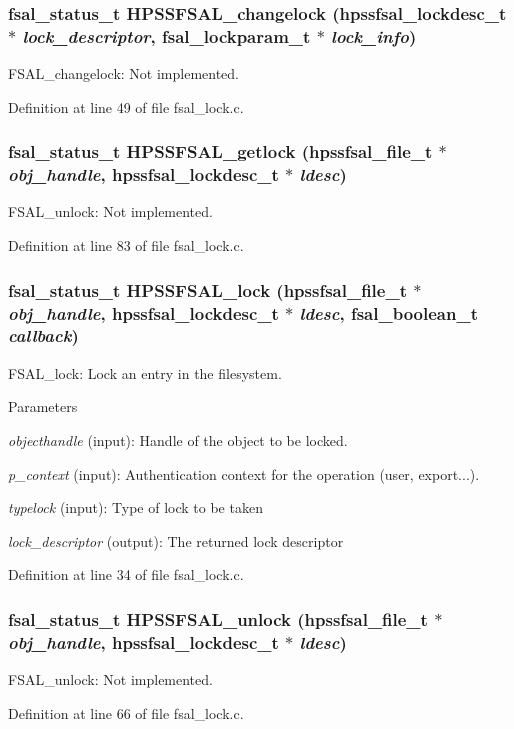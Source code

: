 \subsubsection[{HPSSFSAL\_\-changelock}]{\setlength{\rightskip}{0pt plus 5cm}fsal\_\-status\_\-t HPSSFSAL\_\-changelock (hpssfsal\_\-lockdesc\_\-t $\ast$ {\em lock\_\-descriptor}, \/  fsal\_\-lockparam\_\-t $\ast$ {\em lock\_\-info})}\label{fsal__lock_8c_a1477a0a33dbc4e71308baa30e1f72417}
FSAL\_\-changelock: Not implemented. 

Definition at line 49 of file fsal\_\-lock.c.
\subsubsection[{HPSSFSAL\_\-getlock}]{\setlength{\rightskip}{0pt plus 5cm}fsal\_\-status\_\-t HPSSFSAL\_\-getlock (hpssfsal\_\-file\_\-t $\ast$ {\em obj\_\-handle}, \/  hpssfsal\_\-lockdesc\_\-t $\ast$ {\em ldesc})}\label{fsal__lock_8c_ab3f9128422583ee2fa1ab1308bc5dc43}
FSAL\_\-unlock: Not implemented. 

Definition at line 83 of file fsal\_\-lock.c.
\subsubsection[{HPSSFSAL\_\-lock}]{\setlength{\rightskip}{0pt plus 5cm}fsal\_\-status\_\-t HPSSFSAL\_\-lock (hpssfsal\_\-file\_\-t $\ast$ {\em obj\_\-handle}, \/  hpssfsal\_\-lockdesc\_\-t $\ast$ {\em ldesc}, \/  fsal\_\-boolean\_\-t {\em callback})}\label{fsal__lock_8c_aaeb5054fb0a9ca51e57a72ad04a05edb}
FSAL\_\-lock: Lock an entry in the filesystem.


\begin{DoxyParams}{Parameters}
\item[{\em objecthandle}](input): Handle of the object to be locked. \item[{\em p\_\-context}](input): Authentication context for the operation (user, export...). \item[{\em typelock}](input): Type of lock to be taken \item[{\em lock\_\-descriptor}](output): The returned lock descriptor \end{DoxyParams}


Definition at line 34 of file fsal\_\-lock.c.
\subsubsection[{HPSSFSAL\_\-unlock}]{\setlength{\rightskip}{0pt plus 5cm}fsal\_\-status\_\-t HPSSFSAL\_\-unlock (hpssfsal\_\-file\_\-t $\ast$ {\em obj\_\-handle}, \/  hpssfsal\_\-lockdesc\_\-t $\ast$ {\em ldesc})}\label{fsal__lock_8c_ae875ec69f247f05783edb99664c4fc24}
FSAL\_\-unlock: Not implemented. 

Definition at line 66 of file fsal\_\-lock.c.